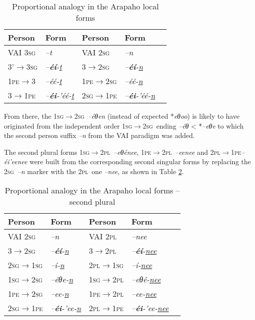\documentclass[twoside,a4paper,11pt]{article}
\newcommand{\ipa}[1]{{\phon\textit{#1}}}
\newcommand{\sg}{\textsc{sg}}
\newcommand{\pl}{\textsc{pl}}
\newcommand{\grise}[1]{\cellcolor{lightgray}\textbf{#1}}
\newcommand{\pe}{\textsc{pe}}
\begin{document}
\begin{table}[H]
\caption{Proportional analogy in the Arapaho local forms}
\centering \label{tab:arapaho.analogy.local}
\begin{tabular}{lllll}
\toprule
 Person &  Form &  Person &  Form\\
\midrule 
 VAI 3\sg & \ipa{--t} &  VAI 2\sg & \ipa{--n} \\
  3'$\rightarrow$3\sg & \ipa{--\textbf{éí}-\underline{t}} &   3$\rightarrow$2\sg & \ipa{--\textbf{éí}-\underline{n}} \\
  \midrule 
    1\pe$\rightarrow$3 & \ipa{--éé-\underline{t}} & 1\pe$\rightarrow$2\sg &  \grise{}\ipa{--éé-\underline{n}} \\
  3$\rightarrow$1\pe & \ipa{--\textbf{éi}-'éé-\underline{t}} & 2\sg$\rightarrow$1\pe &  \grise{}\ipa{--\textbf{éi}-'éé-\underline{n}} \\
\bottomrule
\end{tabular}
\end{table}

From there, the 1\sg$\rightarrow$2\sg\  \ipa{--éθen} (instead of expected *\ipa{eθoo}) is likely to have originated from the independent order 1\sg$\rightarrow$2\sg\ ending \ipa{--éθ} < *\ipa{--eθe} to which the second person suffix \ipa{--n} from the VAI paradigm was added. 

The second plural forms 1\sg$\rightarrow$2\pl\ \ipa{--eθénee}, 1\pe$\rightarrow$2\pl\ \ipa{--eenee}  and 2\pl$\rightarrow$1\pe \ipa{--éi'eenee} were built from the corresponding second singular forms by replacing the 2\sg\  \ipa{--n} marker with the 2\pl\ one \ipa{--nee}, as shown in Table \ref{tab:arapaho.analogy.local2}.
 
 
 \begin{table}[H]
\caption{Proportional analogy in the Arapaho local forms -- second plural}
\centering \label{tab:arapaho.analogy.local2}
\begin{tabular}{lllll}
\toprule
 Person &  Form &  Person &  Form\\
\midrule 
 VAI 2\sg & \ipa{--n} &  VAI 2\pl & \ipa{--nee} \\
  3$\rightarrow$2\sg & \ipa{--\textbf{éí}-\underline{n}} &   3$\rightarrow$2\pl & \ipa{--\textbf{éí}-\underline{nee}} \\
2\sg$\rightarrow$1\sg &  \ipa{--í-\underline{n}} & 2\pl$\rightarrow$1\sg &  \ipa{--í-\underline{nee}} \\
   \midrule 
    1\sg$\rightarrow$2\sg& \ipa{--éθe-\underline{n}} & 1\sg$\rightarrow$2\pl &\ipa{--eθé-\underline{nee}} \grise{} \\
    1\pe$\rightarrow$2\sg&\ipa{--ee-\underline{n}} & 1\pe$\rightarrow$2\pl &\ipa{--ee-\underline{nee}}\grise{} \\
    2\sg$\rightarrow$1\pe& \ipa{--\textbf{éi}-'ee-\underline{n}} & 2\pl$\rightarrow$1\pe & \ipa{--\textbf{éi}-'ee-\underline{nee}}\grise{}\\
\bottomrule
\end{tabular}
\end{table}
 
\end{document}
